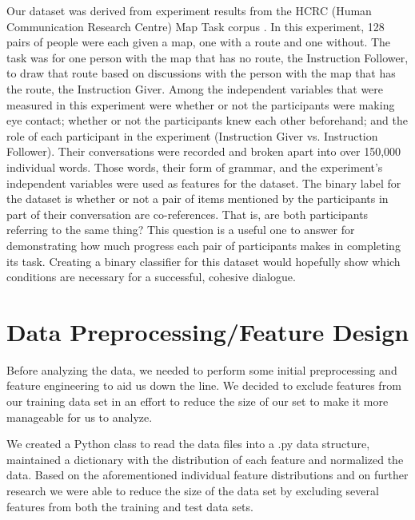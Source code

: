 \documentclass[twoside,11pt]{article}
\begin{document}
Our dataset was derived from experiment results from the HCRC (Human Communication Research Centre) Map Task corpus \citep{thomson06}. In this experiment, 128 pairs of people were each given a map, one with a route and one without. The task was for one person with the map that has no route, the Instruction Follower, to draw that route based on discussions with the person with the map that has the route, the Instruction Giver. Among the independent variables that were measured in this experiment were whether or not the participants were making eye contact; whether or not the participants knew each other beforehand; and the role of each participant in the experiment (Instruction Giver vs. Instruction Follower). Their conversations were recorded and broken apart into over 150,000 individual words. Those words, their form of grammar, and the experiment's independent variables were used as features for the dataset. The binary label for the dataset is whether or not a pair of items mentioned by the participants in part of their conversation are co-references. That is, are both participants referring to the same thing? This question is a useful one to answer for demonstrating how much progress each pair of participants makes in completing its task. Creating a binary classifier for this dataset would hopefully show which conditions are necessary for a successful, cohesive dialogue.

\section{Data Preprocessing/Feature Design}

	Before analyzing the data, we needed to perform some initial preprocessing and feature engineering to aid us down the line. We decided to exclude features from our training data set in an effort to reduce the size of our set to make it more manageable for us to analyze.

We created a Python class to read the data files into a .py data structure, maintained a dictionary with the distribution of each feature and normalized the data. Based on the aforementioned individual feature distributions and on further research we were able to reduce the size of the data set by excluding several features from both the training and test data sets.
\end{document}

